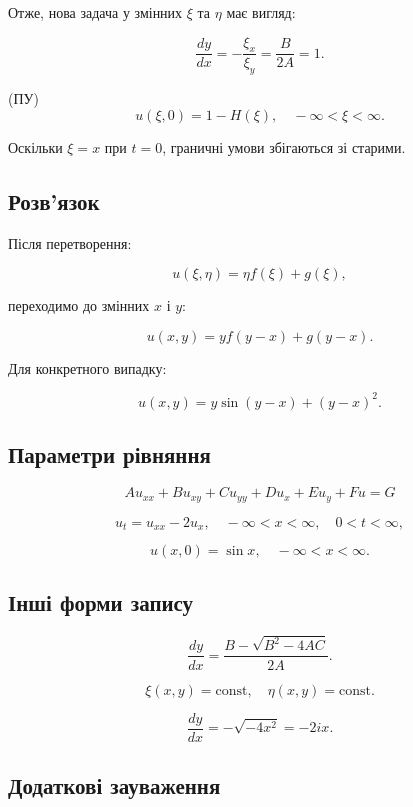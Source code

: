 Отже, нова задача у змінних \(\xi\) та \(\eta\) має вигляд:

\[
\frac{dy}{dx} = -\frac{\xi_x}{\xi_y} = \frac{B}{2A} = 1.
\]

(ПУ) \[
u(\xi, 0) = 1 - H(\xi), \quad -\infty < \xi < \infty.
\]

Оскільки \(\xi = x\) при \(t = 0\), граничні умови збігаються зі старими.

\subsection{Розв'язок}\label{ux440ux43eux437ux432ux44fux437ux43eux43a}

Після перетворення:

\[
u(\xi, \eta) = \eta f(\xi) + g(\xi),
\]

переходимо до змінних \(x\) і \(y\):

\[
u(x, y) = y f(y - x) + g(y - x).
\]

Для конкретного випадку:

\[
u(x, y) = y \sin(y - x) + (y - x)^2.
\]

\subsection{Параметри рівняння}\label{ux43fux430ux440ux430ux43cux435ux442ux440ux438-ux440ux456ux432ux43dux44fux43dux43dux44f}

\[
A u_{xx} + B u_{xy} + C u_{yy} + D u_x + E u_y + F u = G
\]

\[
u_t = u_{xx} - 2u_x, \quad -\infty < x < \infty, \quad 0 < t < \infty,
\]

\[
u(x, 0) = \sin x, \quad -\infty < x < \infty.
\]

\subsection{Інші форми запису}\label{ux456ux43dux448ux456-ux444ux43eux440ux43cux438-ux437ux430ux43fux438ux441ux443}

\[
\frac{dy}{dx} = \frac{B - \sqrt{B^2 - 4AC}}{2A}.
\]

\[
\xi(x, y) = \text{const}, \quad \eta(x, y) = \text{const}.
\]

\[
\frac{dy}{dx} = -\sqrt{-4x^2} = -2ix.
\]

\subsection{Додаткові зауваження}\label{ux434ux43eux434ux430ux442ux43aux43eux432ux456-ux437ux430ux443ux432ux430ux436ux435ux43dux43dux44f}

